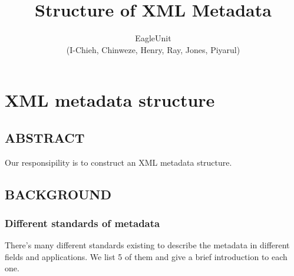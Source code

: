 \documentclass[a4paper]{article}
\begin{document}

\title{Structure of XML Metadata}
\author{EagleUnit \\ (I-Chieh, Chinweze, Henry, Ray, Jones, Piyarul)} 

\maketitle                     %




% 
% 

\section*{XML metadata structure}
\subsection{ABSTRACT}
\label{sec:abs}
Our responsipility is to construct an XML metadata structure.

\subsection{BACKGROUND}

\subsubsection{Different standards of metadata}
\label{sec:mets}
There's many different standards existing to describe the metadata in different fields and applications. We list 5 of them and give a brief introduction to each one.
\end{document}
